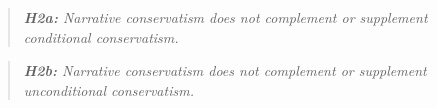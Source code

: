 \documentclass[letterpaper,12pt]{article}
\begin{document}
\begin{spacing}{1.5}
\begin{quote}\label{hyp:h2a}
	\textit{\textbf{H2a:} Narrative conservatism does not complement or supplement conditional conservatism.}
\end{quote}

\begin{quote}\label{hyp:h2b}
	\textit{\textbf{H2b:} Narrative conservatism does not complement or supplement unconditional conservatism.}
\end{quote}

\begin{comment}
\subsection{Conditional, Unconditional and Narrative Conservatism: Usefulness}

\end{comment}
\end{spacing}
\end{document}
